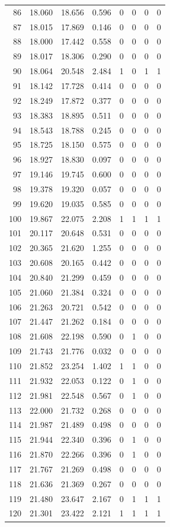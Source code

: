 \begin{longtable}{rrrrrrrr}
86 & 18.060 & 18.656 & 0.596 & 0 & 0 & 0 & 0\\
87 & 18.015 & 17.869 & 0.146 & 0 & 0 & 0 & 0\\
88 & 18.000 & 17.442 & 0.558 & 0 & 0 & 0 & 0\\
89 & 18.017 & 18.306 & 0.290 & 0 & 0 & 0 & 0\\
90 & 18.064 & 20.548 & 2.484 & 1 & 0 & 1 & 1\\
91 & 18.142 & 17.728 & 0.414 & 0 & 0 & 0 & 0\\
92 & 18.249 & 17.872 & 0.377 & 0 & 0 & 0 & 0\\
93 & 18.383 & 18.895 & 0.511 & 0 & 0 & 0 & 0\\
94 & 18.543 & 18.788 & 0.245 & 0 & 0 & 0 & 0\\
95 & 18.725 & 18.150 & 0.575 & 0 & 0 & 0 & 0\\
96 & 18.927 & 18.830 & 0.097 & 0 & 0 & 0 & 0\\
97 & 19.146 & 19.745 & 0.600 & 0 & 0 & 0 & 0\\
98 & 19.378 & 19.320 & 0.057 & 0 & 0 & 0 & 0\\
99 & 19.620 & 19.035 & 0.585 & 0 & 0 & 0 & 0\\
100 & 19.867 & 22.075 & 2.208 & 1 & 1 & 1 & 1\\
101 & 20.117 & 20.648 & 0.531 & 0 & 0 & 0 & 0\\
102 & 20.365 & 21.620 & 1.255 & 0 & 0 & 0 & 0\\
103 & 20.608 & 20.165 & 0.442 & 0 & 0 & 0 & 0\\
104 & 20.840 & 21.299 & 0.459 & 0 & 0 & 0 & 0\\
105 & 21.060 & 21.384 & 0.324 & 0 & 0 & 0 & 0\\
106 & 21.263 & 20.721 & 0.542 & 0 & 0 & 0 & 0\\
107 & 21.447 & 21.262 & 0.184 & 0 & 0 & 0 & 0\\
108 & 21.608 & 22.198 & 0.590 & 0 & 1 & 0 & 0\\
109 & 21.743 & 21.776 & 0.032 & 0 & 0 & 0 & 0\\
110 & 21.852 & 23.254 & 1.402 & 1 & 1 & 0 & 0\\
111 & 21.932 & 22.053 & 0.122 & 0 & 1 & 0 & 0\\
112 & 21.981 & 22.548 & 0.567 & 0 & 1 & 0 & 0\\
113 & 22.000 & 21.732 & 0.268 & 0 & 0 & 0 & 0\\
114 & 21.987 & 21.489 & 0.498 & 0 & 0 & 0 & 0\\
115 & 21.944 & 22.340 & 0.396 & 0 & 1 & 0 & 0\\
116 & 21.870 & 22.266 & 0.396 & 0 & 1 & 0 & 0\\
117 & 21.767 & 21.269 & 0.498 & 0 & 0 & 0 & 0\\
118 & 21.636 & 21.369 & 0.267 & 0 & 0 & 0 & 0\\
119 & 21.480 & 23.647 & 2.167 & 0 & 1 & 1 & 1\\
120 & 21.301 & 23.422 & 2.121 & 1 & 1 & 1 & 1\\
\end{longtable}\normalsize